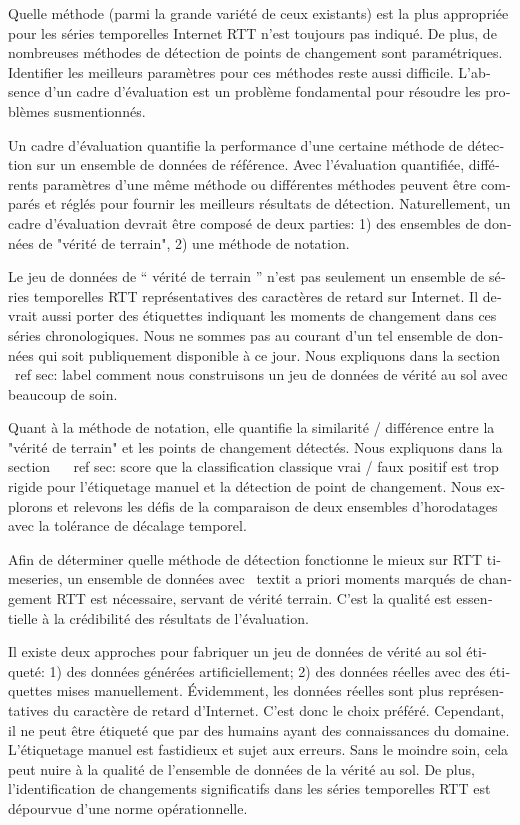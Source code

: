 \begin{otherlanguage}{french}
Quelle méthode (parmi la grande variété de ceux existants) est la plus appropriée pour les séries temporelles Internet RTT n'est toujours pas indiqué.
De plus, de nombreuses méthodes de détection de points de changement sont paramétriques.
Identifier les meilleurs paramètres pour ces méthodes reste aussi difficile.
L'absence d'un cadre d'évaluation est un problème fondamental pour résoudre les problèmes susmentionnés.

Un cadre d'évaluation quantifie la performance d'une certaine méthode de détection sur un ensemble de données de référence.
Avec l'évaluation quantifiée, différents paramètres d'une même méthode ou différentes méthodes peuvent être comparés et réglés pour fournir les meilleurs résultats de détection.
Naturellement, un cadre d'évaluation devrait être composé de deux parties: 1) des ensembles de données de "vérité de terrain", 2) une méthode de notation.

Le jeu de données de `` vérité de terrain '' n'est pas seulement un ensemble de séries temporelles RTT représentatives des caractères de retard sur Internet.
Il devrait aussi porter des étiquettes indiquant les moments de changement dans ces séries chronologiques.
Nous ne sommes pas au courant d'un tel ensemble de données qui soit publiquement disponible à ce jour.
Nous expliquons dans la section ~ \ ref {sec: label} comment nous construisons un jeu de données de vérité au sol avec beaucoup de soin.

Quant à la méthode de notation, elle quantifie la similarité / différence entre la "vérité de terrain" et les points de changement détectés.
Nous expliquons dans la section ~ \ ref {sec: score} que la classification classique vrai / faux positif est trop rigide pour l'étiquetage manuel et la détection de point de changement.
Nous explorons et relevons les défis de la comparaison de deux ensembles d'horodatages avec la tolérance de décalage temporel.

Afin de déterminer quelle méthode de détection fonctionne le mieux sur RTT timeseries,
un ensemble de données avec \ textit {a priori} moments marqués de changement RTT est nécessaire, servant de vérité terrain.
C'est la qualité est essentielle à la crédibilité des résultats de l'évaluation.

Il existe deux approches pour fabriquer un jeu de données de vérité au sol étiqueté: 1) des données générées artificiellement; 2) des données réelles avec des étiquettes mises manuellement.
Évidemment, les données réelles sont plus représentatives du caractère de retard d'Internet.
C'est donc le choix préféré.
Cependant, il ne peut être étiqueté que par des humains ayant des connaissances du domaine.
L'étiquetage manuel est fastidieux et sujet aux erreurs.
Sans le moindre soin, cela peut nuire à la qualité de l'ensemble de données de la vérité au sol.
De plus, l'identification de changements significatifs dans les séries temporelles RTT est dépourvue d'une norme opérationnelle.


\end{otherlanguage}
